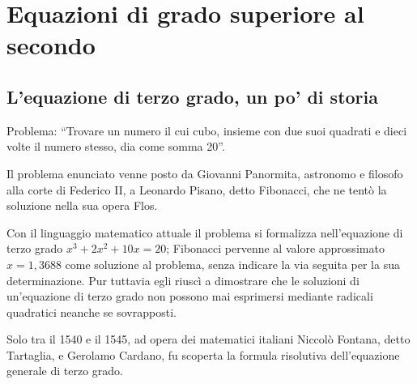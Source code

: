 \chapter{Equazioni di grado superiore al secondo}
\section{L'equazione di terzo grado, un po' di storia}
Problema: “Trovare un numero il cui cubo, insieme con due suoi quadrati e dieci volte il numero stesso, dia come somma 20”.

Il problema enunciato venne posto da Giovanni Panormita, astronomo e filosofo alla corte di Federico II, a Leonardo Pisano, detto Fibonacci, che ne tentò la soluzione nella sua opera Flos.

Con il linguaggio matematico attuale il problema si formalizza nell’equazione di terzo grado $x^3+2x^2+10x=20$; Fibonacci pervenne al valore approssimato $x=1,3688$ come soluzione al problema, senza indicare la via seguita per la sua determinazione. Pur tuttavia egli riuscì a dimostrare che le soluzioni di un’equazione di terzo grado non possono mai esprimersi mediante radicali quadratici neanche se sovrapposti.

Solo tra il 1540 e il 1545, ad opera dei matematici italiani Niccolò Fontana, detto Tartaglia, e Gerolamo Cardano, fu scoperta la formula risolutiva dell’equazione generale di terzo grado.

